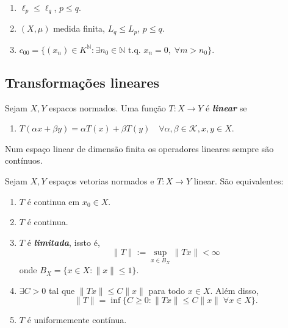 \documentclass[portuguese]{article}
\theoremstyle{definition}
\newcommand{\N}{\mathbb{N}}
\begin{document}
	\begin{obs}\leavevmode
		\begin{enumerate}
			\item $\ell_p\leq\ell_q$, $p\leq q$.
			\item $(X,\mu)$ medida finita, $L_q\leq L_p$, $p\leq q$.
			\item $c_{00}=\{(x_n)\in K^\N:\exists n_0\in \N \text{ t.q. }x_n=0,\;\forall m>n_0\}$.
		\end{enumerate}
	\end{obs}
	\subsection{Transformações lineares}
	Sejam $X,Y$ espacos normados. Uma função $T:X\to Y$ é \textbf{\textit{linear}} se
	\begin{enumerate}
		\item $T(\alpha x+\beta y)=\alpha T(x)+\beta T(y)\quad\forall \alpha,\beta\in\mathcal{K},x,y\in X$.
	\end{enumerate}
	\begin{obs}
		Num espaço linear de dimensão finita os operadores lineares sempre são contínuos.
	\end{obs}
	\begin{prop}
		Sejam $X,Y$ espaços vetorias normados e $T:X\to Y$ linear. São equivalentes:
		\begin{enumerate}
			\item $T$ é continua em $x_0\in X$.
			\item $T$ é continua.
			\item $T$ é \textbf{\textit{limitada}}, issto é,
			\[\| T\|:=\sup_{x\in B_X}\| Tx\|<\infty\]
			onde $B_X=\{x\in X:\| x\|\leq1\}$.
			\item $\exists C>0$ tal que $\| Tx\|\leq C\| x\|$ para todo $x\in X$. Além disso,
			\[\| T\|=\inf\{C\geq0:\| Tx\|\leq C\| x\|\;\forall x\in X\}.\]
			\item $T$ é uniformemente contínua.
		\end{enumerate}
	\end{prop}
\end{document}
